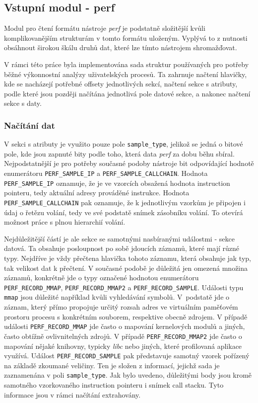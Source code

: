 \documentclass[czech,BP]{thesiskiv}
\begin{document}
\subsection{Vstupní modul - perf}

Modul pro čtení formátu nástroje \emph{perf} je podstatně složitější kvůli komplikovanějším strukturám v tomto formátu uloženým. Vyplývá to z nutnosti obsáhnout širokou škálu druhů dat, které lze tímto nástrojem shromažďovat.

V rámci této práce byla implementována sada struktur používaných pro potřeby běžné výkonnostní analýzy uživatelských procesů. Ta zahrnuje načtení hlavičky, kde se nacházejí potřebné offsety jednotlivých sekcí, načtení sekce s atributy, podle které jsou později načítána jednotlivá pole datové sekce, a nakonec načtení sekce s daty.

\subsubsection*{Načítání dat}

V sekci s atributy je využito pouze pole \texttt{sample\_type}, jelikož se jedná o bitové pole, kde jsou zapnuté bity podle toho, která data \emph{perf} za dobu běhu sbíral. Nejpodstatnější je pro potřeby současné podoby nástroje bit odpovídající hodnotě enumerátoru \texttt{PERF\_SAMPLE\_IP} a \texttt{PERF\_SAMPLE\_CALLCHAIN}. Hodnota \texttt{PERF\_SAMPLE\_IP} oznamuje, že je ve vzorcích obsažená hodnota instruction pointeru, tedy aktuální adresy prováděné instrukce. Hodnota \texttt{PERF\_SAMPLE\_CALLCHAIN} pak oznamuje, že k jednotlivým vzorkům je připojen i údaj o řetězu volání, tedy ve své podstatě snímek zásobníku volání. To otevírá možnost práce s plnou hierarchií volání.

Nejdůležitější částí je ale sekce se samotnými nasbíranými událostmi - sekce datová. Ta obsahuje posloupnost po sobě jdoucích záznamů, které mají různé typy. Nejdříve je vždy přečtena hlavička tohoto záznamu, která obsahuje jak typ, tak velikost dat k přečtení. V současné podobě je důležitá jen omezená množina záznamů, konkrétně jde o typy označené hodnotou enumerátoru \texttt{PERF\_RECORD\_MMAP}, \texttt{PERF\_RECORD\_MMAP2} a \texttt{PERF\_RECORD\_SAMPLE}. Události typu \texttt{mmap} jsou důležité například kvůli vyhledávání symbolů. V~podstatě jde o záznam, který přímo propojuje určitý rozsah adres ve virtuálním paměťovém prostoru procesu s konkrétním souborem, respektive obecně zdrojem. V případě události \texttt{PERF\_RECORD\_MMAP} jde často o mapování kernelových modulů a jiných, často obtížně ovlivnitelných zdrojů. V případě \texttt{PERF\_RECORD\_MMAP2} jde často o mapování nějaké knihovny, typicky \emph{libc} nebo jiných, které profilovaná aplikace využívá. Událost \texttt{PERF\_RECORD\_SAMPLE} pak představuje samotný vzorek pořízený na základě zkoumané veličiny. Ten je složen z informací, jejichž sada je zaznamenána v poli \texttt{sample\_type}. Jak bylo uvedeno, důležitými body jsou kromě samotného vzorkovaného instruction pointeru i snímek call stacku. Tyto informace jsou v rámci načítání extrahovány.
\end{document}
